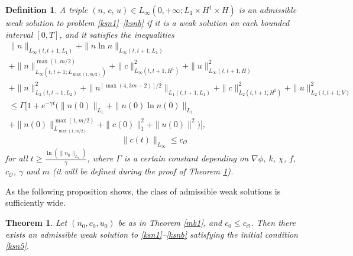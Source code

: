 \documentclass[10pt]{amsart}
\newtheorem {theorem} {Theorem} [section]
\newtheorem{preremark2}{Definition}[section]
\newenvironment{defn}
  {\begin{preremark2}\rm}{\end{preremark2}}
\begin{document}
\begin{defn} A triple $(n,\, c,\, u)\in L_{\infty}(0, +\infty; L_1 \times H^1 \times H)$ 
is an \textit{admissible weak solution} to problem \eqref{ksn1}--\eqref{ksnb}
if it is a weak solution on each bounded interval $[0,T]$, and it satisfies the inequalities \begin{multline}\label{ener} \|n\|_{L_{\infty}(t,t+1;L_1)}+\|n\ln n\|_{L_{\infty}(t,t+1;L_1)} \\ +\|n\|_{L_{\infty}(t,t+1;L_{\max(1,m/2)})}^{\max(1,m/2)}+\|c\|^2_{L_{\infty}(t,t+1;H^1)}+\|u\|^2_{L_{\infty}(t,t+1;H)} \\ +\|n\|^2_{L_{2}(t,t+1;L_2)}+\|n^{[\max(4,3m-2)]/2}\|_{L_{1}(t,t+1;L_1)}+\|c\|_{L_{2}(t,t+1;H^2)}^2+\|u\|_{L_{2}(t,t+1;V)}^2 \\ \leq \Gamma[1+e^{-\gamma t}(\|n(0)\|_{L_1}+\|n(0)\ln n(0)\|_{L_1} \\ +\|n(0)\|_{L_{\max(1,m/2)}}^{\max(1,m/2)}+\|c(0)\|^2_1+\|u(0)\|^2)],\end{multline} 
\begin{equation}\label{vol} \|c(t)\|_{L_{\infty}} \leq c_\mathcal{O} \end{equation} for all $t\geq \frac{\ln (\|n_0\|_{L_1})}\gamma$, where $\Gamma$ is a certain constant depending on $\nabla \phi$, $k$, $\chi$, $f$, $c_\mathcal{O}$, $\gamma$ and $m$ (it will be defined during the proof of Theorem \ref{wsol1}).
\end{defn}

As the following proposition shows, the class of admissible weak solutions is sufficiently wide.

\begin{theorem} \label{wsol1} Let $(n_0,c_0,u_0)$ be as in Theorem \ref{mb1}, and $c_0 \leq c_\mathcal{O}$. Then there exists an admissible weak solution to \eqref{ksn1}--\eqref{ksnb} satisfying the initial condition \eqref{ksn5}. \end{theorem}
\end{document}
